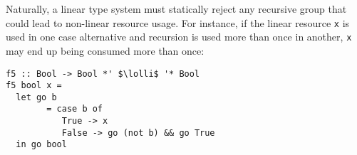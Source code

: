 \documentclass[acmsmall,review,anonymous,screen]{acmart}
\newcommand{\incode}[1]{\lstinline{#1}}
\newcommand{\lolli}{\multimap}
\begin{document}
Naturally, a linear type system must statically reject any recursive group that could
lead to non-linear resource usage.
%
%
%
For instance, if the linear resource \incode{x} is used in one case alternative and
recursion is used more than once in another, \incode{x} may end up being consumed
more than once:
%
\begin{noway}
\begin{lstlisting}
f5 :: Bool -> Bool *' $\lolli$ '* Bool
f5 bool x =
  let go b
        = case b of
           True -> x
           False -> go (not b) && go True
  in go bool
\end{lstlisting}
\end{noway}
%
\end{document}
